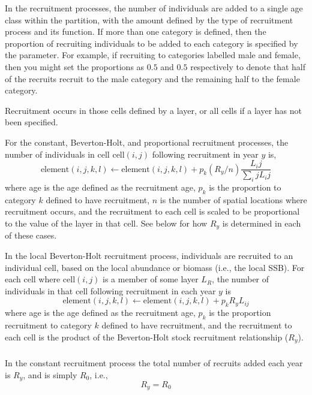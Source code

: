 In the recruitment processes, the number of individuals are added to a single age class within the partition, with the amount defined by the type of recruitment process and its function. If more than one category is defined, then the proportion of recruiting individuals to be added to each category is specified by the  parameter. For example, if recruiting to categories labelled male and female, then you might set the proportions as $0.5$ and $0.5$ respectively to denote that half of the recruits recruit to the male category and the remaining half to the female category.

Recruitment occurs in those cells defined by a layer, or all cells if a layer has not been specified.

For the constant, Beverton-Holt, and proportional recruitment processes, the  number of individuals in cell cell$(i,j)$ following recruitment in year $y$ is,  
\begin{equation}
  \text{element}(i,j,k,l) \leftarrow \text{element}(i,j,k,l) + p_k(R_y / n) \frac{L_ij}{\sum_ij L_ij}
\end{equation}
where age is the age defined as the recruitment age, $p_k$ is the proportion to category $k$ defined to have recruitment, $n$ is the number of spatial locations where recruitment occurs, and the recruitment to each cell is scaled to be proportional to the value of the layer in that cell. See below for how $R_y$ is determined in each of these cases.

In the local Beverton-Holt recruitment process, individuals are recruited to an individual cell, based on the local abundance or biomass (i.e., the local SSB). For each cell where cell$(i,j)$ is a member of some layer $L_R$, the number of individuals in that cell following recruitment in each year $y$ is 
\begin{equation}
  \text{element}(i,j,k,l) \leftarrow \text{element}(i,j,k,l) + p_k R_y L_{ij}
\end{equation}
where age is the age defined as the recruitment age, $p_k$ is the proportion recruitment to category $k$ defined to have recruitment, and the recruitment to each cell is the product of the Beverton-Holt stock recruitment relationship ($R_y$). 

\subsubsection*{}

In the constant recruitment process the total number of recruits added each year is $R_y$, and is simply $R_0$, i.e.,
\begin{equation}
  R_y = R_0
\end{equation}

